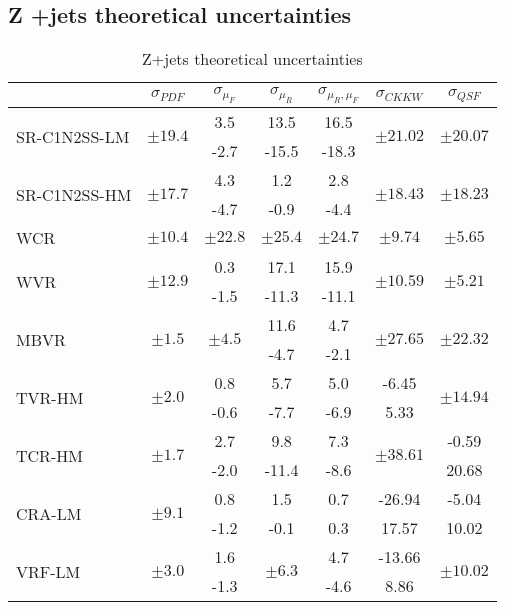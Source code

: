 \subsection*{Z +jets theoretical uncertainties}
\begin{table}
\centering
\begin{tabular}{|l|c|c|c|c|c|c|}
\hline 
 & $\sigma_{PDF}$ & $\sigma_{\mu_{F}}$ & $\sigma_{\mu_{R}}$ & $\sigma_{\mu_{R},\mu_{F}}$ & $\sigma_{CKKW}$ & $\sigma_{QSF}$\tabularnewline
\hline 
\multirow{2}{*}{SR-C1N2SS-LM} & \multirow{2}{*}{$\pm19.4$} & 3.5  & 13.5  & 16.5  & \multirow{2}{*}{$\pm21.02$} & \multirow{2}{*}{$\pm20.07$}\tabularnewline
 &  & -2.7  & -15.5  & -18.3 &  & \tabularnewline
\hline 
\multirow{2}{*}{SR-C1N2SS-HM} & \multirow{2}{*}{$\pm17.7$} & 4.3  & 1.2  & 2.8  & \multirow{2}{*}{$\pm18.43$} & \multirow{2}{*}{$\pm18.23$}\tabularnewline
 &  & -4.7  & -0.9  & -4.4 &  & \tabularnewline
\hline 
\multirow{2}{*}{WCR} & \multirow{2}{*}{$\pm10.4$} & \multirow{2}{*}{$\pm22.8$} & \multirow{2}{*}{$\pm25.4$} & \multirow{2}{*}{$\pm24.7$} & \multirow{2}{*}{$\pm9.74$} & \multirow{2}{*}{$\pm5.65$}\tabularnewline
 &  &  &  &  &  & \tabularnewline
\hline 
\multirow{2}{*}{WVR} & \multirow{2}{*}{$\pm12.9$} & 0.3  & 17.1  & 15.9  & \multirow{2}{*}{$\pm10.59$} & \multirow{2}{*}{$\pm5.21$}\tabularnewline
 &  & -1.5  & -11.3  & -11.1 &  & \tabularnewline
\hline 
\multirow{2}{*}{MBVR} & \multirow{2}{*}{$\pm1.5$} & \multirow{2}{*}{$\pm4.5$} & 11.6  & 4.7  & \multirow{2}{*}{$\pm27.65$} & \multirow{2}{*}{$\pm22.32$}\tabularnewline
 &  &  & -4.7  & -2.1 &  & \tabularnewline
\hline 
\multirow{2}{*}{TVR-HM} & \multirow{2}{*}{$\pm2.0$} & 0.8  & 5.7  & 5.0  & -6.45 & \multirow{2}{*}{$\pm14.94$}\tabularnewline
 &  & -0.6  & -7.7  & -6.9 & 5.33 & \tabularnewline
\hline 
\multirow{2}{*}{TCR-HM} & \multirow{2}{*}{$\pm1.7$} & 2.7  & 9.8  & 7.3  & \multirow{2}{*}{$\pm38.61$} & -0.59\tabularnewline
 &  & -2.0  & -11.4  & -8.6 &  & 20.68\tabularnewline
\hline 
\multirow{2}{*}{CRA-LM} & \multirow{2}{*}{$\pm9.1$} & 0.8  & 1.5  & 0.7  & -26.94 & -5.04\tabularnewline
 &  & -1.2  & -0.1  & 0.3 & 17.57 & 10.02\tabularnewline
\hline 
\multirow{2}{*}{VRF-LM} & \multirow{2}{*}{$\pm3.0$} & 1.6  & \multirow{2}{*}{$\pm6.3$} & 4.7  & -13.66 & \multirow{2}{*}{$\pm10.02$}\tabularnewline
 &  & -1.3  &  & -4.6 & 8.86 & \tabularnewline
\hline 
\end{tabular}
\caption{Z+jets theoretical uncertainties \label{tab:MB:SS:presel}}
\end{table}

